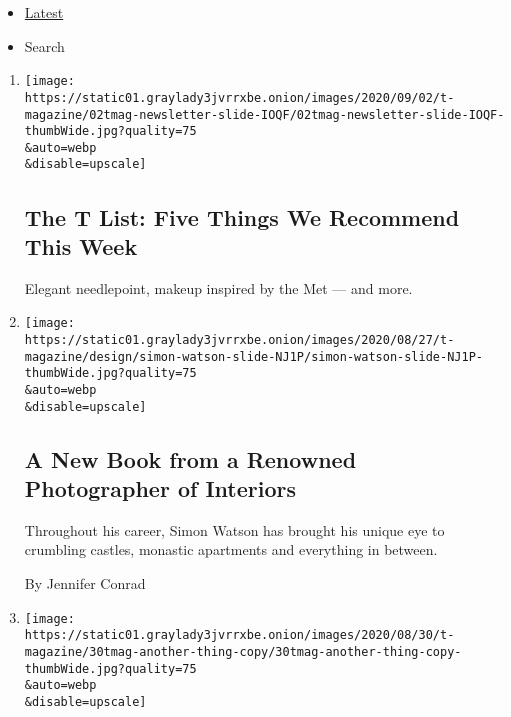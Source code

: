 \begin{itemize}
\tightlist
\item
  \protect\hyperlink{stream-panel}{Latest}
\item
  Search
\end{itemize}

\begin{enumerate}
\def\labelenumi{\arabic{enumi}.}
\item
  \href{/2020/09/03/t-magazine/ollies-pizza-estee-lauder-met.html}{}

  \texttt{[image: https://static01.graylady3jvrrxbe.onion/images/2020/09/02/t-magazine/02tmag-newsletter-slide-IOQF/02tmag-newsletter-slide-IOQF-thumbWide.jpg?quality=75\\\&auto=webp\\\&disable=upscale]}

  \hypertarget{the-t-list-five-things-we-recommend-this-week}{%
  \subsection{The T List: Five Things We Recommend This
  Week}\label{the-t-list-five-things-we-recommend-this-week}}

  Elegant needlepoint, makeup inspired by the Met --- and more.
\item
  \href{/2020/08/31/t-magazine/simon-watson-photographer-book-design.html}{}

  \texttt{[image: https://static01.graylady3jvrrxbe.onion/images/2020/08/27/t-magazine/design/simon-watson-slide-NJ1P/simon-watson-slide-NJ1P-thumbWide.jpg?quality=75\\\&auto=webp\\\&disable=upscale]}

  \hypertarget{a-new-book-from-a-renowned-photographer-of-interiors}{%
  \subsection{A New Book from a Renowned Photographer of
  Interiors}\label{a-new-book-from-a-renowned-photographer-of-interiors}}

  Throughout his career, Simon Watson has brought his unique eye to
  crumbling castles, monastic apartments and everything in between.

  By Jennifer Conrad
\item
  \href{/2020/08/28/t-magazine/bebitalia-camaleonda-sofa.html}{}

  \texttt{[image: https://static01.graylady3jvrrxbe.onion/images/2020/08/30/t-magazine/30tmag-another-thing-copy/30tmag-another-thing-copy-thumbWide.jpg?quality=75\\\&auto=webp\\\&disable=upscale]}


\end{enumerate}
